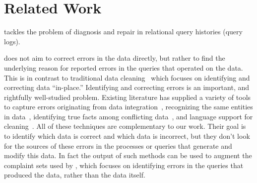
\section{Related Work}
\label{s:related} 
\sys tackles the problem of diagnosis and repair in relational query
histories (query logs). 


\sys does not aim to correct errors in the data
directly, but rather to find the underlying reason for reported errors
in the queries that operated on the data. 
This is in contrast to
traditional data 
cleaning~\cite{dallachiesa2013nadeef, rahm00, Raman01, Kalashnikov06, Fan2008b
} which focuses on identifying and correcting data
``in-place.'' Identifying and correcting errors is an important, and
rightfully well-studied problem. Existing literature has supplied a
variety of tools to capture errors originating from data
integration~\cite{Abiteboul99
},
recognizing the same entities in data~\cite{Koudas2006, GruenheidDS14
}, identifying true facts among conflicting
data~\cite{yin2008truth, DN09, ltm2012
}, and language support for
cleaning~\cite{Galhardas2000}. All of these techniques are
complementary to our work. Their goal is to identify which data is
correct and which data is incorrect, but they don't look for the
sources of these errors in the processes or queries that generate and
modify this data. In fact the output of such methods can be used to
augment the complaint sets used by \sys, which focuses on identifying
errors in the queries that produced the data, rather than the data
itself.

